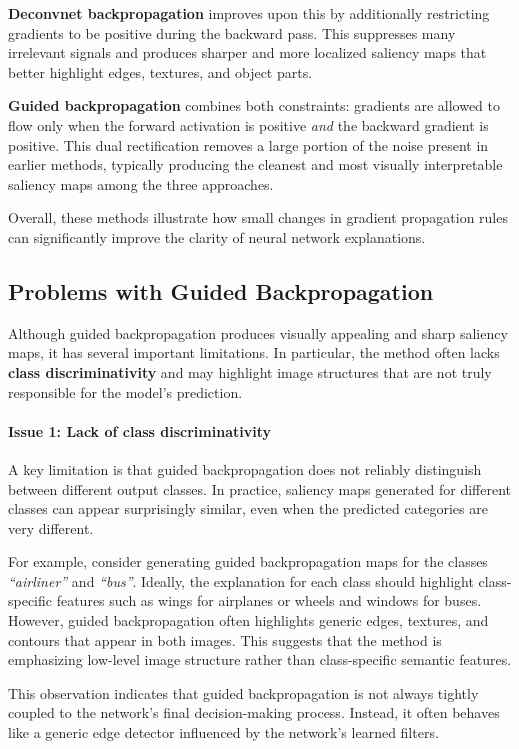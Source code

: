 \documentclass{article}
\begin{document}
\textbf{Deconvnet backpropagation} improves upon this by additionally restricting gradients to be positive during the backward pass. This suppresses many irrelevant signals and produces sharper and more localized saliency maps that better highlight edges, textures, and object parts.

\textbf{Guided backpropagation} combines both constraints: gradients are allowed to flow only when the forward activation is positive \emph{and} the backward gradient is positive. This dual rectification removes a large portion of the noise present in earlier methods, typically producing the cleanest and most visually interpretable saliency maps among the three approaches.

Overall, these methods illustrate how small changes in gradient propagation rules can significantly improve the clarity of neural network explanations.

\subsection{Problems with Guided Backpropagation}

Although guided backpropagation produces visually appealing and sharp saliency maps, it has several important limitations. In particular, the method often lacks \textbf{class discriminativity} and may highlight image structures that are not truly responsible for the model’s prediction.

\paragraph{Issue 1: Lack of class discriminativity}

A key limitation is that guided backpropagation does not reliably distinguish between different output classes. In practice, saliency maps generated for different classes can appear surprisingly similar, even when the predicted categories are very different.

For example, consider generating guided backpropagation maps for the classes \emph{``airliner''} and \emph{``bus''}. Ideally, the explanation for each class should highlight class-specific features such as wings for airplanes or wheels and windows for buses. However, guided backpropagation often highlights generic edges, textures, and contours that appear in both images. This suggests that the method is emphasizing low-level image structure rather than class-specific semantic features.

This observation indicates that guided backpropagation is not always tightly coupled to the network’s final decision-making process. Instead, it often behaves like a generic edge detector influenced by the network’s learned filters.
\end{document}
